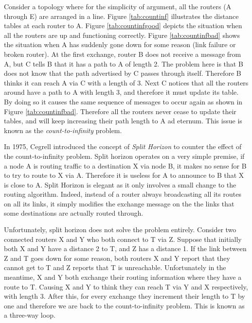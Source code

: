 Consider a topology where for the simplicity of argument, all the routers (A through E) are arranged in a line. Figure \ref{tab:countinf} illustrates the distance tables at each router to A. Figure \ref{tab:countinfgood} depicts the situation when all the routers are up and functioning correctly. Figure \ref{tab:countinfbad} shows the situation when A has suddenly gone down for some reason (link failure or broken router). At the first exchange, router B does not receive a message from A, but C tells B that it has a path to A of length 2. The problem here is that B does not know that the path advertised by C passes through itself. Therefore B thinks it can reach A via C with a length of 3. Next C notices that all the routers around have a path to A with length 3, and therefore it must update its table. By doing so it causes the same sequence of messages to occur again as shown in Figure \ref{tab:countinfbad}. Therefore all the routers never cease to update their tables, and will keep increasing their path length to A ad eternum. This issue is known as the \textit{count-to-infinity} problem.


In 1975, Cegrell introduced the concept of \textit{Split Horizon} \cite{Cegrell75} to counter the effect of the count-to-infinity problem. Split horizon operates on a very simple premise, if a node A is routing traffic to a destination X via node B, it makes no sense for B to try to route to X via A. Therefore it is useless for A to announce to B that X is close to A. Split Horizon is elegant as it only involves a small change to the routing algorithm. Indeed, instead of a router always broadcasting all its routes on all its links, it simply modifies the exchange message on the the links that some destinations are actually routed through. 


Unfortunately, split horizon does not solve the problem entirely. Consider two connected routers X and Y who both connect to T via Z. Suppose that initially both X and Y have a distance 2 to T, and Z has a distance 1. If the link between Z and T goes down for some reason, both routers X and Y report that they cannot get to T and Z reports that T is unreachable. Unfortunately in the meantime, X and Y both exchange their routing information where they have a route to T. Causing X and Y to think they can reach T via Y and X respectively, with length 3. After this, for every exchange they increment their length to T by one and therefore we are back to the count-to-infinity problem. This is known as a three-way loop.




